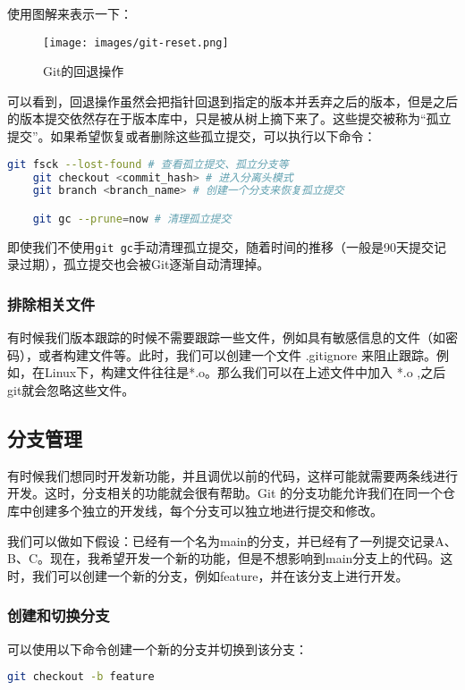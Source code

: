 \documentclass[../main.tex]{subfiles}
\begin{document}
使用图解来表示一下：
\begin{figure}[ht]
  \centering
  \texttt{[image: images/git-reset.png]}
  \caption{Git的回退操作}
  \label{fig:git-reset}
\end{figure}
可以看到，回退操作虽然会把指针回退到指定的版本并丢弃之后的版本，但是之后的版本提交依然存在于版本库中，只是被从树上摘下来了。这些提交被称为“孤立提交”。如果希望恢复或者删除这些孤立提交，可以执行以下命令：
\begin{lstlisting}[language=bash]
    git fsck --lost-found # 查看孤立提交、孤立分支等
    git checkout <commit_hash> # 进入分离头模式
    git branch <branch_name> # 创建一个分支来恢复孤立提交

    git gc --prune=now # 清理孤立提交
\end{lstlisting}
即使我们不使用\texttt{git gc}手动清理孤立提交，随着时间的推移（一般是90天提交记录过期），孤立提交也会被Git逐渐自动清理掉。

\subsubsection{排除相关文件}

有时候我们版本跟踪的时候不需要跟踪一些文件，例如具有敏感信息的文件（如密码），或者构建文件等。此时，我们可以创建一个文件 .gitignore 来阻止跟踪。例如，在Linux下，构建文件往往是*.o。那么我们可以在上述文件中加入 *.o ,之后git就会忽略这些文件。

\subsection{分支管理}

有时候我们想同时开发新功能，并且调优以前的代码，这样可能就需要两条线进行开发。这时，分支相关的功能就会很有帮助。Git 的分支功能允许我们在同一个仓库中创建多个独立的开发线，每个分支可以独立地进行提交和修改。

我们可以做如下假设：已经有一个名为main的分支，并已经有了一列提交记录A、B、C。现在，我希望开发一个新的功能，但是不想影响到main分支上的代码。这时，我们可以创建一个新的分支，例如feature，并在该分支上进行开发。

\subsubsection{创建和切换分支}

可以使用以下命令创建一个新的分支并切换到该分支：
\begin{lstlisting}[language=bash]
git checkout -b feature
\end{lstlisting}
\end{document}

